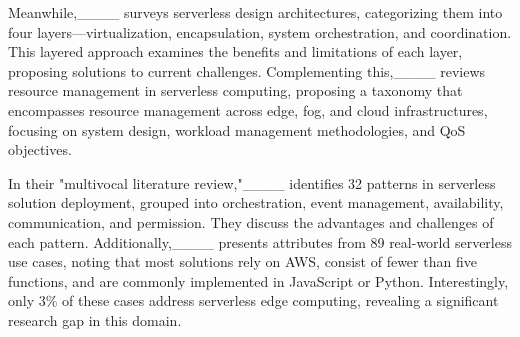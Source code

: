Meanwhile,____ surveys serverless design architectures, categorizing them into four layers—virtualization, encapsulation, system orchestration, and coordination. This layered approach examines the benefits and limitations of each layer, proposing solutions to current challenges. Complementing this,____ reviews resource management in serverless computing, proposing a taxonomy that encompasses resource management across edge, fog, and cloud infrastructures, focusing on system design, workload management methodologies, and QoS objectives.

In their "multivocal literature review,"____ identifies 32 patterns in serverless solution deployment, grouped into orchestration, event management, availability, communication, and permission. They discuss the advantages and challenges of each pattern. Additionally,____ presents attributes from 89 real-world serverless use cases, noting that most solutions rely on AWS, consist of fewer than five functions, and are commonly implemented in JavaScript or Python. Interestingly, only 3\% of these cases address serverless edge computing, revealing a significant research gap in this domain.

